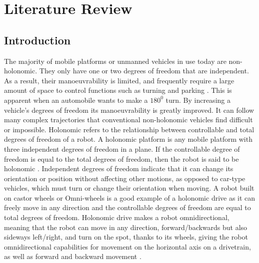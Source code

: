 \section{Literature Review}
\label{sec:review}

\subsection{Introduction}
The majority of mobile platforms or unmanned vehicles in use today are non-holonomic.
They only have one or two degrees of freedom that are independent. As a result, their
manoeuvrability is limited, and frequently require a large amount of space to control
functions such as turning and parking \cite{sheridan_telerobotics_1992}. This is apparent when an automobile wants to make a $180^0$ turn.
By increasing a vehicle’s degrees of freedom its manoeuvrability is greatly improved. It can follow many complex trajectories that conventional non-holonomic vehicles find difficult or impossible. Holonomic refers to the relationship between controllable and total degrees of
freedom of a robot. A holonomic platform is any mobile platform with three independent
degrees of freedom in a plane. If the controllable degree of freedom is equal to the total
degrees of freedom, then the robot is said to be holonomic \cite{titan_robotics_vision_and_control_fundamental_nodate}. Independent degrees of freedom indicate that it can change its orientation or position without affecting other motions, as
opposed to car-type vehicles, which must turn or change their orientation when moving.
A robot built on castor wheels or Omni-wheels is a good example of a holonomic drive as it can freely move in any direction and the controllable degrees of freedom are equal to total degrees of freedom. Holonomic drive makes a robot omnidirectional, meaning that the robot can move in any direction, forward/backwards but also sideways left/right, and turn on the spot, thanks to its wheels, giving the robot omnidirectional capabilities for movement on the horizontal axis on a drivetrain, as well as forward and backward movement \cite{robotics_omnidirectional_2022}.

